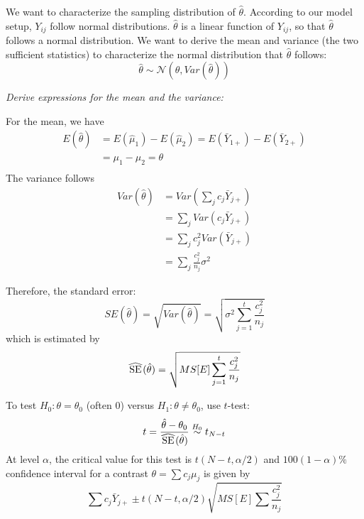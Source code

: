 We want to characterize the sampling distribution of $\hat{\theta}$.
According to our model setup, $Y_{ij}$ follow normal distributions.
$\hat{\theta}$ is a linear function of $Y_{ij}$, so that $\hat{\theta}$ follows a normal distribution.
We want to derive the mean and variance (the two sufficient statistics) to characterize the normal distribution that $\hat{\theta}$ follows:
$$
\hat{\theta} \sim \mathcal{N}(\theta, Var(\hat{\theta}))
$$

{\it Derive expressions for the mean and the variance:}\\
\begin{pf}
	For the mean, we have
	$$
	\begin{aligned}
E(\hat{\theta}) &= E(\hat{\mu}_1) - E(\hat{\mu}_2) = E(\bar{Y}_{1+}) - E(\bar{Y}_{2+})\\
&= \mu_1 - \mu_2 = \theta \\
	\end{aligned}
	$$
	The variance follows
	$$
	\begin{aligned}
		Var(\hat{\theta}) &= Var(\sum\limits_j c_j \bar{Y}_{j+})\\
		&= \sum\limits_j Var(c_j \bar{Y}_{j+})\\
		&= \sum\limits_j c_j^2 Var(\bar{Y}_{j+})\\
		&= \sum\limits_j  \frac{c_j^2}{n_j} \sigma^2
	\end{aligned}
	$$
\end{pf}

Therefore, the standard error:
$$
SE(\hat{\theta}) = \sqrt{Var(\hat{\theta})} = \sqrt{\sigma^2 \sum\limits_{j = 1}^t \frac{c_j^2}{n_j}}
$$
which is estimated by
$$
\reallywidehat{SE}(\hat{\theta}) = \sqrt{MS[E] \sum\limits_{j = 1}^t \frac{c_j^2}{n_j}}
$$

To test $H_0: \theta =\theta_0$ (often $0$) versus $H_1: \theta \ne \theta_0$, use $t$-test:
$$
t = \frac{\hat{\theta} - \theta_0}{\reallywidehat{SE}(\hat{\theta})} \distas{H_0} t_{N-t}
$$
At level $\alpha$, the critical value for this test is $t(N - t, \alpha/2)$
and $100(1 - \alpha)\%$ confidence interval for a contrast $\theta = \sum c_j \mu_j$ is given by
$$
\sum c_j \bar{Y}_{j+} \pm t(N - t, \alpha /2)\sqrt{MS[E] \sum \frac{c_j^2}{n_j}}
$$


